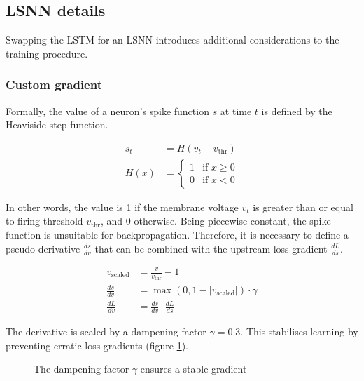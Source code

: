 \documentclass[../../report.tex]{subfiles}
\begin{document}
\subsection{LSNN details}

Swapping the LSTM for an LSNN introduces additional considerations to the
training procedure.

\subsubsection{Custom gradient}
Formally, the value of a neuron's spike function \(s\) at time \(t\) is defined
by the Heaviside step function.

\begin{align*}
  s_t &= H(v_t - v_\mathrm{thr})
  \\
  H(x) &=
  \begin{cases}
  1 & \text{if } x \geq 0 \\
  0 & \text{if } x < 0
  \end{cases}
\end{align*}

In other words, the value is 1 if the membrane voltage \(v_t\) is greater than
or equal to firing threshold \(v_\mathrm{thr}\), and 0 otherwise. Being
piecewise constant, the spike function is unsuitable for backpropagation.
Therefore, it is necessary to define a pseudo-derivative \(\frac{ds}{dv}\) that
can be combined with the upstream loss gradient \(\frac{dL}{ds}\).

\begin{align*}
  v_\mathrm{scaled} &= \frac{v}{v_\mathrm{thr}} - 1
  \\
  \frac{ds}{dv} &= \max(0, 1 - \left| v_\mathrm{scaled} \right|) \cdot \gamma
  \\
  \frac{dL}{dv} &= \frac{ds}{dv} \cdot \frac{dL}{ds}
\end{align*}

The derivative is scaled by a dampening factor \(\gamma = 0.3\). This stabilises
learning by preventing erratic loss gradients (figure \ref{fig:dampening}).

\begin{figure}
  \centering
  \caption{The dampening factor \(\gamma\) ensures a stable gradient}
  \label{fig:dampening}
\end{figure}
\end{document}
